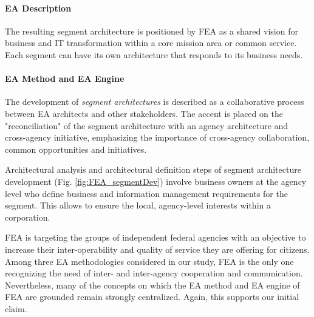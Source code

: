 \paragraph*{EA Description}

The resulting segment architecture is positioned by FEA as a shared vision for business and IT transformation within a core mission area or common service. Each segment can have its own architecture that responds to its business needs.

\paragraph*{EA Method and EA Engine}

The development of \textit{segment architectures} is described as a collaborative process between EA architects and other stakeholders. The accent is placed on the "reconciliation" of the segment architecture with an agency architecture and cross-agency initiative, emphasizing the importance of  cross-agency collaboration, common opportunities and initiatives.

Architectural analysis and architectural definition steps of segment architecture development (Fig. \ref{fig:FEA_segmentDev}) involve business owners at the agency level who define business and information management requirements for the segment. This allows to ensure the local, agency-level interests within a corporation. 

FEA is targeting the groups of independent federal agencies with an objective to increase their inter-operability and quality of service they are offering for citizens. Among three EA methodologies considered in our study, FEA is the only one recognizing the need of inter- and inter-agency cooperation and communication. Nevertheless, many of the concepts on which the EA method and EA engine of FEA are grounded remain strongly centralized. Again, this supports our initial claim.

%
%
%
%
%
%
%
%
%
%
%
